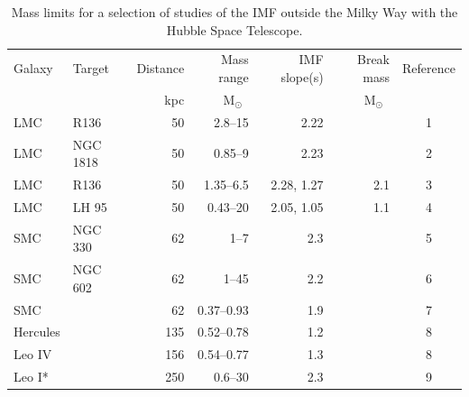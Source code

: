 \documentclass[referee]{aa}
\newcommand{\msun}{M$_\odot$~}
\begin{document}
\begin{table}

    \centering
    \caption{Mass limits for a selection of studies of the IMF outside the Milky Way with the Hubble Space Telescope. }
    \label{tbl:imf_lit_review}

    \begin{tabular}{ l l r r r r c }
        \hline
        \hline
        Galaxy   &  Target      &  Distance &  Mass range       & IMF slope(s) & Break mass          & Reference         \\
                &               & kpc       & \msun             &              & \msun               &                   \\
        \hline
        LMC      &  R136        & 50        & 2.8--15            & 2.22         &                     & 1 \\
        LMC      &  NGC 1818    & 50        & 0.85--9            & 2.23         &                     & 2  \\
        LMC      &  R136        & 50        & 1.35--6.5          & 2.28, 1.27   & 2.1                 & 3     \\
        LMC      &  LH 95       & 50        & 0.43--20           & 2.05, 1.05   & 1.1                 & 4      \\
        \hline
        SMC      &  NGC 330     & 62        & 1--7               & 2.3          &                     & 5    \\
        SMC      &  NGC 602     & 62        & 1--45              & 2.2          &                     & 6     \\
        SMC      &              & 62        & 0.37--0.93         & 1.9          &                     & 7     \\
        \hline
        Hercules &              & 135       & 0.52--0.78         & 1.2          &                     & 8         \\
        Leo IV   &              & 156       & 0.54--0.77         & 1.3          &                     & 8         \\
        Leo I*   &              & 250       & 0.6--30            & 2.3          &                     & 9     \\
        \hline
        \end{tabular}


\end{table}
\end{document}
